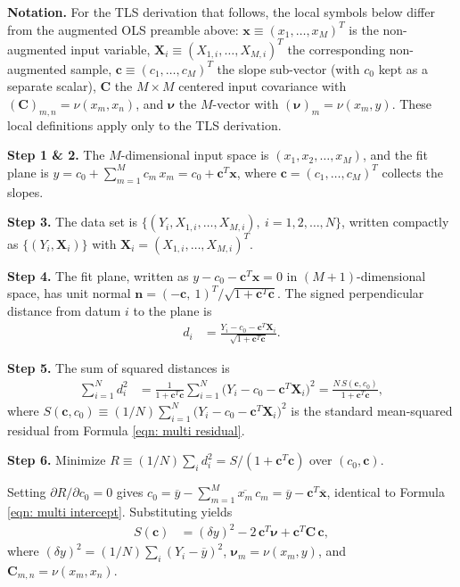 \documentclass[twoside]{article}
\numberwithin{equation}{section}
\begin{document}
\textbf{Notation.} For the TLS derivation that follows, the local symbols below differ from the augmented OLS preamble above: $\mathbf{x} \equiv (x_1, \dots, x_M)^T$ is the non-augmented input variable, $\mathbf{X}_i \equiv (X_{1,i}, \dots, X_{M,i})^T$ the corresponding non-augmented sample, $\mathbf{c} \equiv (c_1, \dots, c_M)^T$ the slope sub-vector (with $c_0$ kept as a separate scalar), $\mathbf{C}$ the $M \times M$ centered input covariance with $(\mathbf{C})_{m,n} = \nu(x_m, x_n)$, and $\boldsymbol{\nu}$ the $M$-vector with $(\boldsymbol{\nu})_m = \nu(x_m, y)$. These local definitions apply only to the TLS derivation.

\textbf{Step 1 \& 2.} The $M$-dimensional input space is $(x_1, x_2, \dots, x_M)$, and the fit plane is $y = c_0 + \sum_{m=1}^{M} c_m\, x_m = c_0 + \mathbf{c}^T \mathbf{x}$, where $\mathbf{c} = (c_1, \dots, c_M)^T$ collects the slopes.

\textbf{Step 3.} The data set is $\{(Y_i, X_{1,i}, \dots, X_{M,i}),\ i = 1, 2, \dots, N\}$, written compactly as $\{(Y_i, \mathbf{X}_i)\}$ with $\mathbf{X}_i = (X_{1,i}, \dots, X_{M,i})^T$.

\textbf{Step 4.} The fit plane, written as $y - c_0 - \mathbf{c}^T \mathbf{x} = 0$ in $(M+1)$-dimensional space, has unit normal $\mathbf{n} = (-\mathbf{c},\ 1)^T/\sqrt{1 + \mathbf{c}^T \mathbf{c}}$. The signed perpendicular distance from datum $i$ to the plane is
\begin{align*}
d_i &= \frac{Y_i - c_0 - \mathbf{c}^T \mathbf{X}_i}{\sqrt{1 + \mathbf{c}^T \mathbf{c}}}.
\end{align*}

\textbf{Step 5.} The sum of squared distances is
\begin{align*}
\sum_{i=1}^{N} d_i^2 &= \frac{1}{1 + \mathbf{c}^T \mathbf{c}} \sum_{i=1}^{N} \bigl( Y_i - c_0 - \mathbf{c}^T \mathbf{X}_i \bigr)^2 = \frac{N\, S(\mathbf{c}, c_0)}{1 + \mathbf{c}^T \mathbf{c}},
\end{align*}
where $S(\mathbf{c}, c_0) \equiv (1/N) \sum_{i=1}^{N} \bigl( Y_i - c_0 - \mathbf{c}^T \mathbf{X}_i \bigr)^2$ is the standard mean-squared residual from Formula \eqref{eqn: multi residual}.

\textbf{Step 6.} Minimize $R \equiv (1/N) \sum_i d_i^2 = S/(1 + \mathbf{c}^T \mathbf{c})$ over $(c_0, \mathbf{c})$.

Setting $\partial R/\partial c_0 = 0$ gives $c_0 = \overline{y} - \sum_{m=1}^{M} \overline{x_m}\, c_m = \overline{y} - \mathbf{c}^T \overline{\mathbf{x}}$, identical to Formula \eqref{eqn: multi intercept}. Substituting yields
\begin{align*}
S(\mathbf{c}) &= (\delta y)^2 - 2\, \mathbf{c}^T \boldsymbol{\nu} + \mathbf{c}^T \mathbf{C}\, \mathbf{c},
\end{align*}
where $(\delta y)^2 = (1/N)\sum_i (Y_i - \overline{y})^2$, $\boldsymbol{\nu}_m = \nu(x_m, y)$, and $\mathbf{C}_{m,n} = \nu(x_m, x_n)$.
\end{document}
